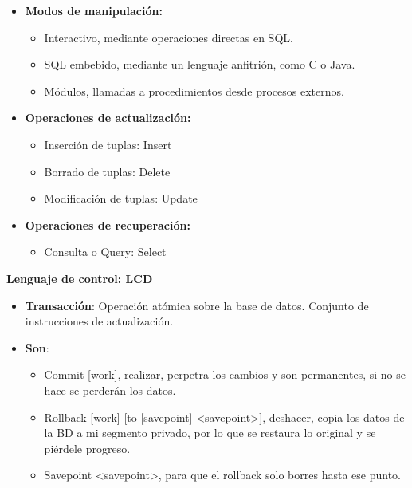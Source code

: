 \documentclass[12pt, twoside, openright]{report} %
\begin{document}
\vspace{-0.5cm}
  \begin{itemize}
  \item \textbf{Modos de manipulación:}
    

    \begin{itemize}
    \item Interactivo, mediante operaciones directas en SQL.
      
    \item SQL embebido, mediante un lenguaje anfitrión, como C o Java.
      
    \item Módulos, llamadas a procedimientos desde procesos externos.
      
    \end{itemize}
  \item \textbf{Operaciones de actualización:}
    

    \begin{itemize}
    \item Inserción de tuplas: Insert
      
    \item Borrado de tuplas: Delete
      
    \item Modificación de tuplas: Update
      
    \end{itemize}
  \item \textbf{Operaciones de recuperación:}
    

    \begin{itemize}
    \item Consulta o Query: Select
      
    \end{itemize}
  \end{itemize}

  
  \textbf{Lenguaje de control: LCD}
  

  \begin{itemize}
  \item \textbf{Transacción}: Operación atómica sobre la base de datos.
    Conjunto de instrucciones de actualización.
    
  \item \textbf{Son}:
    

    \begin{itemize}
    \item Commit {[}work{]}, realizar, perpetra los cambios y son
      permanentes, si no se hace se perderán los datos.
      
    \item Rollback {[}work{]} {[}to {[}savepoint{]}
      \textless savepoint\textgreater{]}, deshacer, copia los datos de
      la BD a mi segmento privado, por lo que se restaura lo original y
      se piérdele progreso.
      
    \item Savepoint \textless savepoint\textgreater, para que el rollback
      solo borres hasta ese punto.
      
    \end{itemize}
  \end{itemize}
\end{document}
